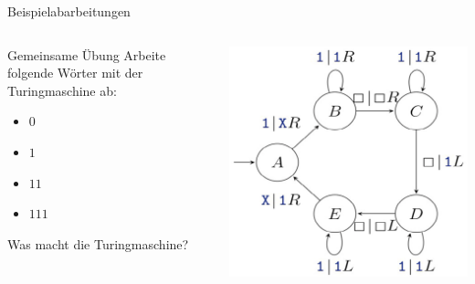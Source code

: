 \documentclass[handout]{beamer}
\begin{document}
\begin{frame}{Beispielabarbeitungen}
\begin{columns}
\begin{column}{0.5\textwidth}
\begin{taskblock}{Gemeinsame Übung}
Arbeite folgende Wörter mit der Turingmaschine ab:
\begin{itemize}
\item $0$
\item $1$
\item $11$
\item $111$
\end{itemize}
Was macht die Turingmaschine?
\end{taskblock}
\end{column}

\begin{column}{0.5\textwidth}
\includegraphics[scale=0.4]{images/turingmaschine_1k.png}
\end{column}
\end{columns}
\end{frame}


\end{document}
